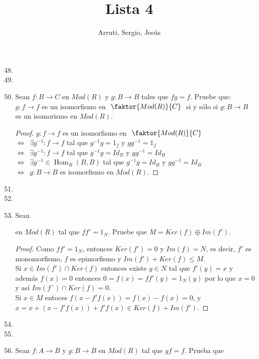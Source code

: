 \documentclass{article}
\title{Lista 4}
\author{Arruti, Sergio, Jesús}
\date{}
\begin{document}
	\maketitle
	\begin{enumerate}[label=\textbf{Ej \arabic*.}]
		\setcounter{enumi}{47}
\item 
\item
\item Sean $f\colon B\rightarrow C$ en $Mod(R)$ y $g\colon B\longrightarrow B$ tales que $fg=f$. Pruebe que:\\
$g\colon f\longrightarrow f$ es un isomorfismo en \,\,$\faktor{Mod(R)}{C}$ \,\,si y sólo si $g\colon B\longrightarrow B$ es un isomorismo en $Mod(R)$.
\begin{proof}

$g\colon f\longrightarrow f$ es un isomorfismo en \,\,$\faktor{Mod(R)}{C}$\,\,\\
$\iff \,\,\,\exists g^{-1}\colon f\longrightarrow f$  tal que $g^{-1}g=1_f$ y $gg^{-1}=1_f$\\
$\iff \,\,\,\exists g^{-1}\colon f\longrightarrow f$  tal que $g^{-1}g=Id_B$ y $gg^{-1}=Id_B$\\
$\iff \,\,\,\exists g^{-1}\in \operatorname{Hom}_R(B,B)$ tal que $g^{-1}g=Id_B$ y $gg^{-1}=Id_B$\\
$\iff \,\,\,g\colon B\longrightarrow B$ es isomorfismo en $Mod(R)$.
\end{proof}

\item
\item
\item Sean 
en $Mod(R)$ tal que $ff'=1_N.$ Pruebe que $M=Ker(f)\oplus Im(f')$.
\begin{proof}
Como $ff'=1_N$, entonces $Ker(f')=0$ y $Im(f)=N$, es decir, $f'$ es monomorfismo, $f$ es epimorfismo y  $Im(f')+Ker(f)\leq M$.\\
Si $x\in Im(f')\cap Ker(f)$ entonces existe $y\in N$ tal que $f'(y)=x$ y además $f(x)=0$ entonces $0=f(x)=ff'(y)=1_N(y)$
por lo que $x=0$ y así $Im(f´)\cap Ker(f)=0$.\\

Si $x\in M$ entoces $f(x-f'f(x))=f(x)-f(x)=0$, \quad y \\
$x=x+(x-f'f(x))+f'f(x)\in Ker (f)+Im(f').$
\end{proof}

\item
\item
\item Sean $f\colon A\longrightarrow B$ y $g\colon B\longrightarrow B$ en $Mod(R)$ tal que $gf=f$. Prueba que\\


\end{enumerate}
\end{document}
